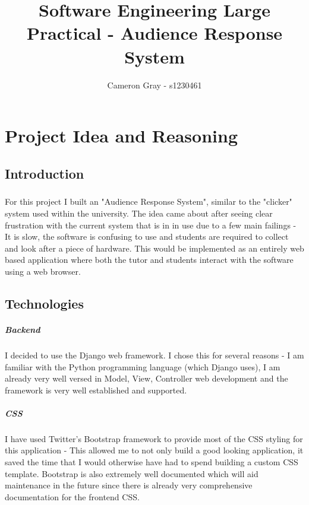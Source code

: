 \documentclass[10pt]{report}
\title{Software Engineering Large Practical - Audience Response System}
\author{Cameron Gray - s1230461}
\begin{document}
	\maketitle
	
	\chapter*{Project Idea and Reasoning}
	\section*{Introduction}
	\paragraph{}
	For this project I built an "Audience Response System", similar to the "clicker" system used within
	the university.  The idea came about after seeing clear frustration with the current system that is in
	in use due to a few main failings - It is slow, the software is confusing to use and students are
	required to collect and look after a piece of hardware.  This would be implemented as an entirely web
	based application where both the tutor and students interact with the software using a web browser.
	
	\section*{Technologies}
	\paragraph{Backend}	
	I decided to use the Django web framework.  I chose this for several reasons - I am
	familiar with the Python programming language (which Django uses), I am already very well versed in
	Model, View, Controller web development and the framework is very well established and supported.
	
	\paragraph{CSS}
	I have used Twitter's Bootstrap framework to provide most of the CSS styling for this application -
	This allowed me to not only build a good looking application, it saved the time that I would otherwise
	have had to spend building a custom CSS template.  Bootstrap is also extremely well documented which
	will aid maintenance in the future since there is already very comprehensive documentation for the
	frontend CSS.
	
\end{document}
